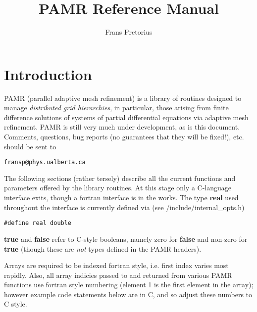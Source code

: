 \documentclass[aps,amssymb,unsortedaddress,nofootinbib]{revtex4}
\begin{document}
\title{PAMR Reference Manual}

\author{Frans Pretorius}

\address{Department of Physics \\
P-412, Avadh Bhatia Physics Laboratory \\
University of Alberta \\
Edmonton, AB, T6G 2J1}

\maketitle

\tableofcontents

\section{Introduction}

PAMR (parallel adaptive mesh refinement) is a library of routines
designed to manage {\em distributed grid hierarchies}, in particular,
those arising from finite difference solutions of systems of partial
differential equations via adaptive mesh refinement. PAMR is still
very much under development, as is this document. Comments, questions,
bug reports (no guarantees that they will be fixed!), etc. should be
sent to
\begin{verbatim}
fransp@phys.ualberta.ca
\end{verbatim}
The following sections (rather tersely) describe all the current functions
and parameters offered by the library routines. At this stage only
a C-language interface exits, though a fortran interface is in the works.
The type {\bf real} used throughout the interface is currently defined 
via (see {\rm /include/internal\_opts.h})
\begin{verbatim}
#define real double
\end{verbatim}
{\bf true} and {\bf false} refer to C-style booleans, namely zero for
{\bf false} and non-zero for {\bf true} (though these are {\em not} 
types defined in the PAMR headers).
\par
Arrays are required to be indexed fortran style, i.e. first index
varies most rapidly. Also, all array indicies passed to and returned from
various PAMR functions use fortran style numbering (element 1 is the first 
element in the array); however example code statements below are in C, 
and so adjust these numbers to C style.

\end{document}
